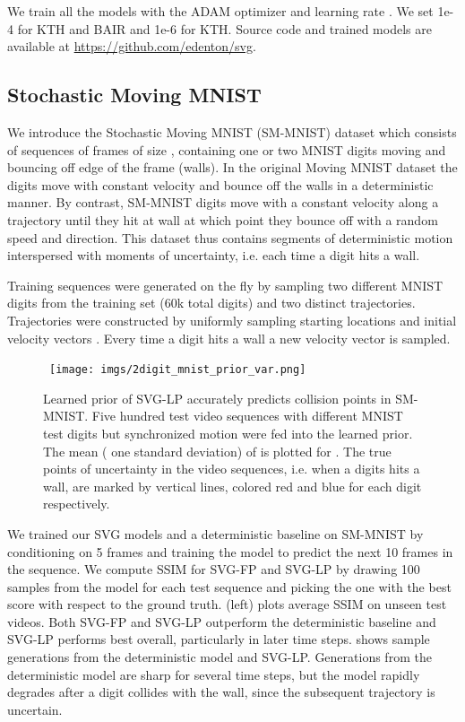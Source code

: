 We train all the models with the ADAM optimizer \cite{adam} and
learning rate . 
We set  1e-4 for KTH and BAIR and  1e-6 for KTH.
Source code and trained models are available at \url{https://github.com/edenton/svg}.


\subsection{Stochastic Moving MNIST}
We introduce the Stochastic Moving MNIST (SM-MNIST) dataset which
consists of sequences of frames of size , containing one
or two MNIST digits moving and bouncing off edge of the frame (walls).
In the original Moving MNIST dataset \cite{Srivastava15} the digits
move with constant velocity and bounce off the walls in a
deterministic manner.  By contrast, SM-MNIST digits move with a
constant velocity along a trajectory until they hit at wall at which
point they bounce off with a random speed and direction.  This
dataset thus contains segments of deterministic motion interspersed
with moments of uncertainty, i.e. each time a digit hits a wall.

Training sequences were
generated on the fly by sampling two different MNIST digits from the
training set (60k total digits) and two distinct trajectories. 
Trajectories were constructed by uniformly sampling  starting locations and initial velocity vectors .
Every time a digit hits a wall a new velocity vector is sampled.



\begin{figure}[t!]
    \centering
\mbox{
\texttt{[image: imgs/2digit\_mnist\_prior\_var.png]}
 }
 \caption{Learned prior of SVG-LP accurately predicts collision points in SM-MNIST. Five hundred test video sequences with different MNIST test digits but synchronized motion were fed into the learned prior. The mean (  one standard deviation) of  is plotted for . The true points of uncertainty in the video sequences, i.e. when a digits hits a wall, are marked by vertical lines, colored red and blue for each digit respectively.} 
      \label{fig:mnist_prior}
\vspace{-3mm}
\end{figure}


We trained our SVG models and a deterministic baseline on SM-MNIST by conditioning on 5 frames and training the model to
predict the next 10 frames in the sequence.  
We compute SSIM for SVG-FP and SVG-LP by drawing 100 samples from the
model for each test sequence and picking the one with the best score
with respect to the ground truth. 
(left) plots average SSIM on unseen test videos.
Both SVG-FP and SVG-LP outperform the deterministic baseline and SVG-LP performs best overall, particularly in later time steps.
 shows sample generations from the deterministic model and SVG-LP. 
Generations from the deterministic model are sharp for several time
steps, but the model rapidly degrades after a digit collides with the wall,
since the subsequent trajectory is uncertain. 


